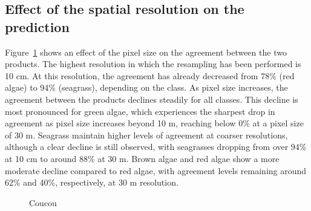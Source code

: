 \documentclass[
  number]{elsarticle}
\begin{document}
\subsection{Effect of the spatial resolution on the
prediction}\label{effect-of-the-spatial-resolution-on-the-prediction}

Figure~\ref{fig-pixelsize} shows an effect of the pixel size on the
agreement between the two products. The highest resolution in which the
resampling has been performed is 10 cm. At this resolution, the
agreement has already decreased from 78\% (red algae) to 94\%
(seagrass), depending on the class. As pixel size increases, the
agreement between the products declines steadily for all classes. This
decline is most pronounced for green algae, which experiences the
sharpest drop in agreement as pixel size increases beyond 10 m, reaching
below 0\% at a pixel size of 30 m. Seagrass maintain higher levels of
agreement at coarser resolutions, although a clear decline is still
observed, with seagrasses dropping from over 94\% at 10 cm to around
88\% at 30 m. Brown algae and red algae show a more moderate decline
compared to red algae, with agreement levels remaining around 62\% and
40\%, respectively, at 30 m resolution.

\label{cell-fig-pixelsize}
\begin{figure}[H]


\caption{\label{fig-pixelsize}Coucou}

\end{figure}%
\end{document}
